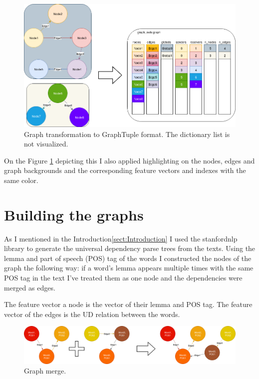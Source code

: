 \begin{figure}[!ht]
	\centering
	\includegraphics[width=150mm, keepaspectratio]{figures/transform_multiple.png}
	\caption{Graph transformation to GraphTuple format. The dictionary list is not visualized.}
	\label{fig:transform_multiple}
\end{figure}

On the Figure \ref{fig:transform_multiple} depicting this I also applied highlighting on the nodes, edges and graph backgrounds and the corresponding feature vectors and indexes with the same color.

\FloatBarrier
\section{Building the graphs}

As I mentioned in the Introduction\ref{sect:Introduction} I used the stanfordnlp library to generate the universal dependency parse trees from the texts. Using the lemma and part of speech (POS) tag of the words I constructed the nodes of the graph the following way: if a word's lemma appears multiple times with the same POS tag in the text I've treated them as one node and the dependencies were merged as edges.

The feature vector a node is the vector of their lemma and POS tag. The feature vector of the edges is the UD relation between the words.

\begin{figure}[!ht]
	\centering
	\includegraphics[width=150mm, keepaspectratio]{figures/merge_graphs_color.png}
	\caption{Graph merge.}
	\label{fig:merge_graph_color}
\end{figure}

